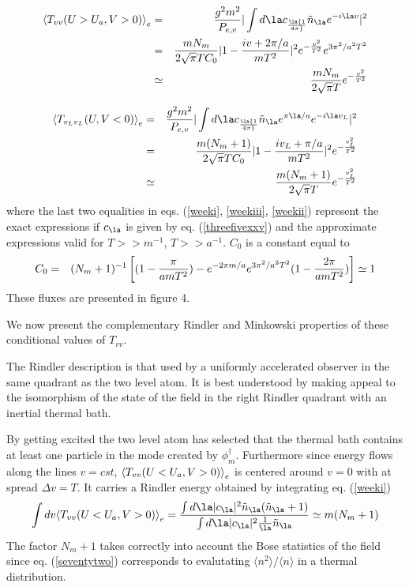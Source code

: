 \begin{eqnarray}
 \bk{T_{vv}(U>U_a, V > 0 )}_{e}
&=&{ g^2 m^2 \over P_{e,v}} \vert \int d \la c_\la
{1 \over 4 \pi}
 \tilde n_\la e^{-i\la v} \vert^2   \nonumber\\
&=& {m N_m \over  2 \sqrt {\pi} T C_0}
 \vert 1 - {i v + 2 \pi /a \over m T^2}\vert^2   e^{-{ v^2\over
T^2}} e^{ 3\pi ^2 / a^2  T^2} \nonumber\\  &\simeq& { m N_m
\over 2 \sqrt{ \pi} T }
e^{-{ v^2\over T^2}}
 \label{weekiii}\end{eqnarray}

\begin{eqnarray}
\bk{T_{v_Lv_L}(U, V < 0 )}_{e}
&=& { g^2 m^2 \over P_{e,v}} \vert
\int d \la c_\la
{1 \over 4 \pi}
\tilde n_\la e^{\pi \la /a} e^{-i\la v_L} \vert^2  \nonumber\\  &=& {m (N_m +
1)
\over  2 \sqrt {\pi} T C_0}
 \vert 1 - {i v_L +  \pi /a \over m T^2} \vert^2 e^{-{ v_L^2\over T^2}}
\nonumber\\ &\simeq& { m (N_m +1)\over 2 \sqrt{ \pi} T } e^{ - {v_L^2
\over T^2}}
\label{weekii}\end{eqnarray}
where the last two equalities in eqs. (\ref{weeki}, \ref{weekiii},
\ref{weekii})
represent the exact expressions if $c_\la$ is given by eq.
(\ref{threefivexxv}) and the
approximate expressions valid for $T>>m^{-1}$, $T>>a^{-1}$. $C_0$ is a constant
equal to \begin{eqnarray}
 C_0 &=& (N_m + 1)^{-1}\left [ (1 - { \pi \over a m T^2}) - e^{- 2 \pi m/a}
e^{ 3\pi ^2 / a^2  T^2} (1 - { 2 \pi \over a m T^2})
\right]
\simeq 1
\end{eqnarray}
These fluxes are presented in figure 4.


We now present the
complementary Rindler and
Minkowski properties of these
conditional values of $T_{vv}$.

The Rindler description is that used by a uniformly accelerated observer in
the same quadrant as the two level atom. It is best understood by making
appeal to the isomorphism of the state of the field in the right Rindler
quadrant with an inertial thermal bath.

By getting excited the two level atom has selected that the thermal bath
contains at least one particle in the mode created by $\phi_m^\dagger$.
Furthermore since energy flows along the lines $v=cst$,
$\mbox{$ \langle T_{vv}(U<U_a, V>0 ) \rangle $}_{e}$ is centered around $v=0$
with at spread $\Delta v =T$.  It carries a Rindler energy obtained by
integrating eq. (\ref{weeki})
\begin{equation}
 \int dv \bk{T_{vv}(U<U_a, V>0 )}_{e} = { \int d \la \vert c_\la
\vert^2 \tilde n_\la ( \tilde n _\la +1 ) \over \int d \la \vert c_\la
\vert^2 {1 \over \la} \tilde n_\la }
\simeq  m(N_m +1)
\label{seventytwo}
\end{equation}
The factor $N_m+1$ takes  correctly into account the Bose statistics of the
field since eq. (\ref{seventytwo}) corresponds to evalutating $\langle n^2
\rangle /\langle n \rangle$
in a thermal
distribution.


